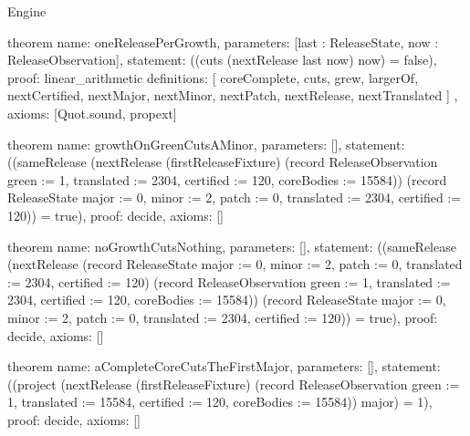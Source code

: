 \begin{lexlean}{Engine}
\begin{semanticmodule}
theorem{
  name: oneReleasePerGrowth,
  parameters: [last : ReleaseState, now : ReleaseObservation],
  statement: ((cuts (nextRelease last now) now) = false),
  proof: linear_arithmetic{
    definitions: [
      coreComplete,
      cuts,
      grew,
      largerOf,
      nextCertified,
      nextMajor,
      nextMinor,
      nextPatch,
      nextRelease,
      nextTranslated
    ]
  },
  axioms: [Quot.sound, propext]
}

theorem{
  name: growthOnGreenCutsAMinor,
  parameters: [],
  statement: ((sameRelease (nextRelease (firstReleaseFixture) (record ReleaseObservation {green := 1, translated := 2304, certified := 120, coreBodies := 15584})) (record ReleaseState {major := 0, minor := 2, patch := 0, translated := 2304, certified := 120})) = true),
  proof: decide{},
  axioms: []
}

theorem{
  name: noGrowthCutsNothing,
  parameters: [],
  statement: ((sameRelease (nextRelease (record ReleaseState {major := 0, minor := 2, patch := 0, translated := 2304, certified := 120}) (record ReleaseObservation {green := 1, translated := 2304, certified := 120, coreBodies := 15584})) (record ReleaseState {major := 0, minor := 2, patch := 0, translated := 2304, certified := 120})) = true),
  proof: decide{},
  axioms: []
}

theorem{
  name: aCompleteCoreCutsTheFirstMajor,
  parameters: [],
  statement: ((project (nextRelease (firstReleaseFixture) (record ReleaseObservation {green := 1, translated := 15584, certified := 120, coreBodies := 15584})) major) = 1),
  proof: decide{},
  axioms: []
}
\end{semanticmodule}
\end{lexlean}
